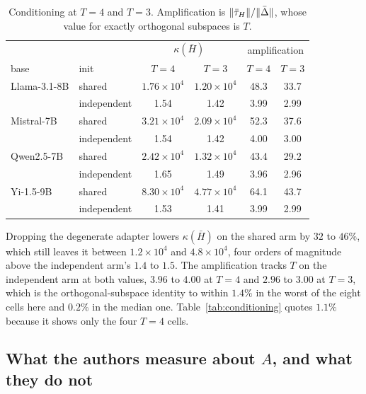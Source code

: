 \begin{table}[tb]
\centering
\small
\caption{Conditioning at $T=4$ and $T=3$. Amplification is
$\|\bar{\tau}_H\|/\|\bar\Delta\|$, whose value for exactly orthogonal subspaces
is $T$.}
\label{tab:conditioning-t3}
\begin{tabular}{llcccc}
\toprule
 & & \multicolumn{2}{c}{$\kappa(\bar H)$} &
\multicolumn{2}{c}{amplification} \\
base & init & $T{=}4$ & $T{=}3$ & $T{=}4$ & $T{=}3$ \\
\midrule
Llama-3.1-8B & shared      & $1.76\times10^{4}$ & $1.20\times10^{4}$ & 48.3 & 33.7 \\
             & independent & 1.54 & 1.42 & 3.99 & 2.99 \\
\addlinespace
Mistral-7B   & shared      & $3.21\times10^{4}$ & $2.09\times10^{4}$ & 52.3 & 37.6 \\
             & independent & 1.54 & 1.42 & 4.00 & 3.00 \\
\addlinespace
Qwen2.5-7B   & shared      & $2.42\times10^{4}$ & $1.32\times10^{4}$ & 43.4 & 29.2 \\
             & independent & 1.65 & 1.49 & 3.96 & 2.96 \\
\addlinespace
Yi-1.5-9B    & shared      & $8.30\times10^{4}$ & $4.77\times10^{4}$ & 64.1 & 43.7 \\
             & independent & 1.53 & 1.41 & 3.99 & 2.99 \\
\bottomrule
\end{tabular}
\end{table}

Dropping the degenerate adapter lowers $\kappa(\bar H)$ on the shared arm
by $32$ to $46\%$, which still leaves it between $1.2\times10^{4}$ and
$4.8\times10^{4}$, four orders of magnitude above the independent arm's
$1.4$ to $1.5$. The amplification tracks $T$ on the independent arm at
both values, $3.96$ to $4.00$ at $T=4$ and $2.96$ to $3.00$ at $T=3$,
which is the orthogonal-subspace identity to within $1.4\%$ in the worst of
the eight cells here and $0.2\%$ in the median one. Table~\ref{tab:conditioning}
quotes $1.1\%$ because it shows only the four $T=4$ cells.

\subsection{What the authors measure about \texorpdfstring{$A$}{A}, and what they do
not}
\label{subsec:drift}

